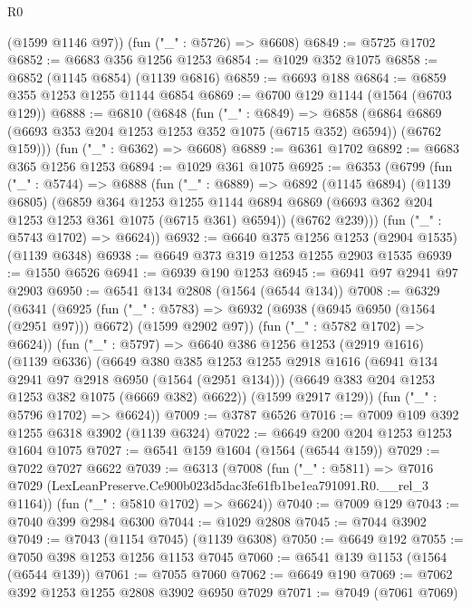 \begin{lexlean}{R0}
\begin{coremodule}
      (@1599 @1146 @97))
    (fun ("_" : @5726) => @6608)
@6849 := @5725 @1702
@6852 := @6683 @356 @1256 @1253
@6854 := @1029 @352 @1075
@6858 := @6852 (@1145 @6854) (@1139 @6816)
@6859 := @6693 @188
@6864 := @6859 @355 @1253 @1255 @1144 @6854
@6869 := @6700 @129 @1144 (@1564 (@6703 @129))
@6888 := @6810
    (@6848
      (fun ("_" : @6849) =>
      @6858 (@6864 @6869 (@6693 @353 @204 @1253 @1253 @352 @1075 (@6715 @352) @6594)) (@6762 @159)))
    (fun ("_" : @6362) => @6608)
@6889 := @6361 @1702
@6892 := @6683 @365 @1256 @1253
@6894 := @1029 @361 @1075
@6925 := @6353
    (@6799
      (fun ("_" : @5744) =>
      @6888
        (fun ("_" : @6889) =>
        @6892
          (@1145 @6894)
          (@1139 @6805)
          (@6859
            @364
            @1253
            @1255
            @1144
            @6894
            @6869
            (@6693 @362 @204 @1253 @1253 @361 @1075 (@6715 @361) @6594))
          (@6762 @239)))
      (fun ("_" : @5743 @1702) => @6624))
@6932 := @6640 @375 @1256 @1253 (@2904 @1535) (@1139 @6348)
@6938 := @6649 @373 @319 @1253 @1255 @2903 @1535
@6939 := @1550 @6526
@6941 := @6939 @190 @1253
@6945 := @6941 @97 @2941 @97 @2903
@6950 := @6541 @134 @2808 (@1564 (@6544 @134))
@7008 := @6329
    (@6341
      (@6925
        (fun ("_" : @5783) =>
        @6932 (@6938 (@6945 @6950 (@1564 (@2951 @97))) @6672) (@1599 @2902 @97))
        (fun ("_" : @5782 @1702) => @6624))
      (fun ("_" : @5797) =>
      @6640
        @386
        @1256
        @1253
        (@2919 @1616)
        (@1139 @6336)
        (@6649
          @380
          @385
          @1253
          @1255
          @2918
          @1616
          (@6941 @134 @2941 @97 @2918 @6950 (@1564 (@2951 @134)))
          (@6649 @383 @204 @1253 @1253 @382 @1075 (@6669 @382) @6622))
        (@1599 @2917 @129))
      (fun ("_" : @5796 @1702) => @6624))
@7009 := @3787 @6526
@7016 := @7009 @109 @392 @1255 @6318 @3902 (@1139 @6324)
@7022 := @6649 @200 @204 @1253 @1253 @1604 @1075
@7027 := @6541 @159 @1604 (@1564 (@6544 @159))
@7029 := @7022 @7027 @6622
@7039 := @6313
    (@7008
      (fun ("_" : @5811) =>
      @7016 @7029 (LexLeanPreserve.Ce900b023d5dac3fe61fb1be1ea791091.R0.__rel_3 @1164))
      (fun ("_" : @5810 @1702) => @6624))
@7040 := @7009 @129
@7043 := @7040 @399 @2984 @6300
@7044 := @1029 @2808
@7045 := @7044 @3902
@7049 := @7043 (@1154 @7045) (@1139 @6308)
@7050 := @6649 @192
@7055 := @7050 @398 @1253 @1256 @1153 @7045
@7060 := @6541 @139 @1153 (@1564 (@6544 @139))
@7061 := @7055 @7060
@7062 := @6649 @190
@7069 := @7062 @392 @1253 @1255 @2808 @3902 @6950 @7029
@7071 := @7049 (@7061 @7069)

\end{coremodule}
\end{lexlean}

